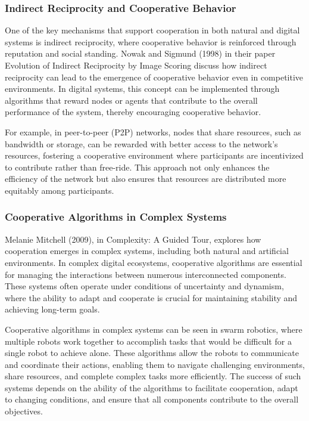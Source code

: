 \documentclass[12pt,twoside]{article}
\begin{document}
\subsubsection{Indirect Reciprocity and Cooperative Behavior}

One of the key mechanisms that support cooperation in both natural and digital systems is indirect reciprocity, where cooperative behavior is reinforced through reputation and social standing. Nowak and Sigmund (1998) in their paper Evolution of Indirect Reciprocity by Image Scoring discuss how indirect reciprocity can lead to the emergence of cooperative behavior even in competitive environments. In digital systems, this concept can be implemented through algorithms that reward nodes or agents that contribute to the overall performance of the system, thereby encouraging cooperative behavior.

For example, in peer-to-peer (P2P) networks, nodes that share resources, such as bandwidth or storage, can be rewarded with better access to the network’s resources, fostering a cooperative environment where participants are incentivized to contribute rather than free-ride. This approach not only enhances the efficiency of the network but also ensures that resources are distributed more equitably among participants.

\subsubsection{Cooperative Algorithms in Complex Systems}

Melanie Mitchell (2009), in Complexity: A Guided Tour, explores how cooperation emerges in complex systems, including both natural and artificial environments. In complex digital ecosystems, cooperative algorithms are essential for managing the interactions between numerous interconnected components. These systems often operate under conditions of uncertainty and dynamism, where the ability to adapt and cooperate is crucial for maintaining stability and achieving long-term goals.

Cooperative algorithms in complex systems can be seen in swarm robotics, where multiple robots work together to accomplish tasks that would be difficult for a single robot to achieve alone. These algorithms allow the robots to communicate and coordinate their actions, enabling them to navigate challenging environments, share resources, and complete complex tasks more efficiently. The success of such systems depends on the ability of the algorithms to facilitate cooperation, adapt to changing conditions, and ensure that all components contribute to the overall objectives.
\end{document}
